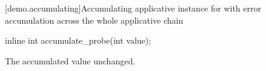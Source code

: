 [demo.accumulating]{Accumulating applicative instance for  with error accumulation across the whole applicative chain}

%
\begin{itemdecl}
inline int accumulate_probe(int value);
\end{itemdecl}

\begin{itemdescr}
\pnum
\returns
The accumulated value unchanged.
\end{itemdescr}
